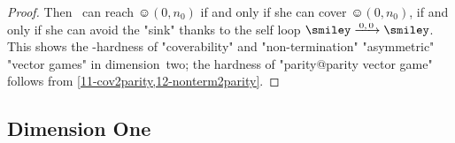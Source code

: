 \begin{proof}
  Then \Eve\ can reach $\smiley(0,n_0)$ if and only if she can cover
  $\smiley(0,n_0)$, if and only if she can avoid the "sink" thanks to
  the self loop $\smiley\step{0,0}\smiley$.  This
  shows the \EXP-hardness of "coverability" and "non-termination"
  "asymmetric" "vector games" in dimension~two; the hardness of
  "parity@parity vector game" follows
  from \cref{11-cov2parity,12-nonterm2parity}.
\end{proof}

  
\subsection{Dimension One}
\label{11-subsec:mono-dim1}
%
